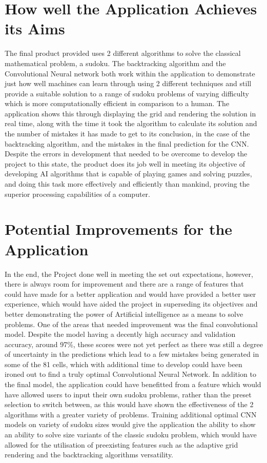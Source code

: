 \documentclass[]{final_report}
\begin{document}
\section{How well the Application Achieves its Aims}
The final product provided uses 2 different algorithms to solve the classical mathematical problem, a sudoku. The backtracking algorithm and the Convolutional Neural network both work within the application to demonstrate just how well machines can learn through using 2 different techniques and still provide a suitable solution to a range of sudoku problems of varying difficulty which is more computationally efficient in comparison to a human. The application shows this through displaying the grid and rendering the solution in real time, along with the time it took the algorithm to calculate its solution and the number of mistakes it has made to get to its conclusion, in the case of the backtracking algorithm, and the mistakes in the final prediction for the CNN. Despite the errors in development that needed to be overcome to develop the project to this state, the product does its job well in meeting its objective of developing AI algorithms that is capable of playing games and solving puzzles, and doing this task more effectively and efficiently than mankind, proving the superior processing capabilities of a computer.

\section{Potential Improvements for the Application}
In the end, the Project done well in meeting the set out expectations, however, there is always room for improvement and there are a range of features that could have made for a better application and would have provided a better user experience, which would have aided the project in superseding its objectives and better demonstrating the power of Artificial intelligence as a means to solve problems. One of the areas that needed improvement was the final convolutional model. Despite the model having a decently high accuracy and validation accuracy, around 97\%, these scores were not yet perfect as there was still a degree of uncertainty in the predictions which lead to a few mistakes being generated in some of the 81 cells, which with additional time to develop could have been ironed out to find a truly optimal Convolutional Neural Network. In addition to the final model, the application could have benefitted from a feature which would have allowed users to input their own sudoku problems, rather than the preset selection to switch between, as this would have shown the effectiveness of the 2 algorithms with a greater variety of problems. Training additional optimal CNN models on variety of sudoku sizes would give the application the ability to show an ability to solve size variants of the classic sudoku problem, which would have allowed for the utilisation of preexisting features such as the adaptive grid rendering and the backtracking algorithms versatility. 
\end{document}
